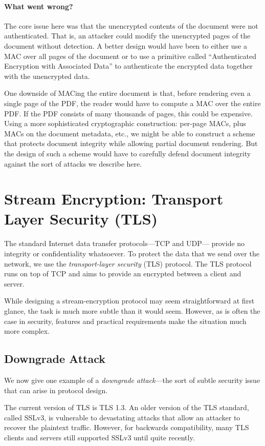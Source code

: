 \paragraph{What went wrong?}
The core issue here was that the unencrypted
contents of the document were not authenticated.
That is, an attacker could modify the
unencrypted pages of the document without detection.
A better design would have been to either use
a MAC over all pages of the document or to use
a primitive called ``Authenticated Encryption with
Associated Data'' to authenticate the encrypted data
together with the unencrypted data.

One downside of MACing the entire document is that,
before rendering even a single page of the PDF,
the reader would have to compute a MAC over the
entire PDF.
If the PDF consists of many thousands of pages, 
this could be expensive.
Using a more sophisticated cryptographic construction:
per-page MACs, plus MACs on the document metadata, etc.,
we might be able to construct a scheme that protects
document integrity while allowing partial document
rendering.
But the design of such a scheme would have to carefully
defend document integrity against the sort of attacks
we describe here.

\section{Stream Encryption: Transport Layer Security (TLS)}
The standard Internet data transfer protocols---TCP and UDP---%
provide no integrity or confidentiality whatsoever.
To protect the data that we send over the network, 
we use the \emph{transport-layer security} (TLS) protocol.
The TLS protocol runs on top of TCP and aims to 
provide an encrypted  between a
client and server.

While designing a stream-encryption protocol may seem straightforward
at first glance, the task is much more subtle than it would seem.
However, as is often the case in security, 
features and practical requirements make the situation much more complex.

\subsection{Downgrade Attack}
We now give one example of a \emph{downgrade attack}---the
sort of subtle security issue that can arise in protocol design.

The current version of TLS is TLS 1.3. An older
version of the TLS standard, called SSLv3,
is vulnerable to devastating
attacks that allow an attacker to recover the plaintext traffic.
However, for backwards compatibility, many TLS clients
and servers still supported SSLv3 until quite recently.

